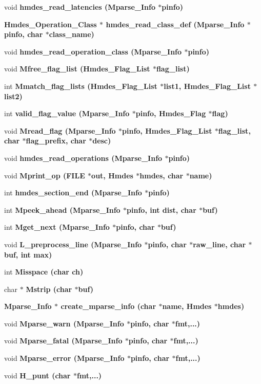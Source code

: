 \begin{CompactItemize}
void \bf{hmdes\_\-read\_\-latencies} (\bf{Mparse\_\-Info} $\ast$pinfo)
\item 
\bf{Hmdes\_\-Operation\_\-Class} $\ast$ \bf{hmdes\_\-read\_\-class\_\-def} (\bf{Mparse\_\-Info} $\ast$pinfo, char $\ast$class\_\-name)
\item 
void \bf{hmdes\_\-read\_\-operation\_\-class} (\bf{Mparse\_\-Info} $\ast$pinfo)
\item 
void \bf{Mfree\_\-flag\_\-list} (\bf{Hmdes\_\-Flag\_\-List} $\ast$flag\_\-list)
\item 
int \bf{Mmatch\_\-flag\_\-lists} (\bf{Hmdes\_\-Flag\_\-List} $\ast$list1, \bf{Hmdes\_\-Flag\_\-List} $\ast$list2)
\item 
int \bf{valid\_\-flag\_\-value} (\bf{Mparse\_\-Info} $\ast$pinfo, \bf{Hmdes\_\-Flag} $\ast$flag)
\item 
void \bf{Mread\_\-flag} (\bf{Mparse\_\-Info} $\ast$pinfo, \bf{Hmdes\_\-Flag\_\-List} $\ast$flag\_\-list, char $\ast$flag\_\-prefix, char $\ast$desc)
\item 
void \bf{hmdes\_\-read\_\-operations} (\bf{Mparse\_\-Info} $\ast$pinfo)
\item 
void \bf{Mprint\_\-op} (FILE $\ast$out, \bf{Hmdes} $\ast$hmdes, char $\ast$\bf{name})
\item 
int \bf{hmdes\_\-section\_\-end} (\bf{Mparse\_\-Info} $\ast$pinfo)
\item 
int \bf{Mpeek\_\-ahead} (\bf{Mparse\_\-Info} $\ast$pinfo, int dist, char $\ast$buf)
\item 
int \bf{Mget\_\-next} (\bf{Mparse\_\-Info} $\ast$pinfo, char $\ast$buf)
\item 
void \bf{L\_\-preprocess\_\-line} (\bf{Mparse\_\-Info} $\ast$pinfo, char $\ast$raw\_\-line, char $\ast$buf, int max)
\item 
int \bf{Misspace} (char ch)
\item 
char $\ast$ \bf{Mstrip} (char $\ast$buf)
\item 
\bf{Mparse\_\-Info} $\ast$ \bf{create\_\-mparse\_\-info} (char $\ast$\bf{name}, \bf{Hmdes} $\ast$hmdes)
\item 
void \bf{Mparse\_\-warn} (\bf{Mparse\_\-Info} $\ast$pinfo, char $\ast$fmt,...)
\item 
void \bf{Mparse\_\-fatal} (\bf{Mparse\_\-Info} $\ast$pinfo, char $\ast$fmt,...)
\item 
void \bf{Mparse\_\-error} (\bf{Mparse\_\-Info} $\ast$pinfo, char $\ast$fmt,...)
\item 
void \bf{H\_\-punt} (char $\ast$fmt,...)
\item 

\end{CompactItemize}
